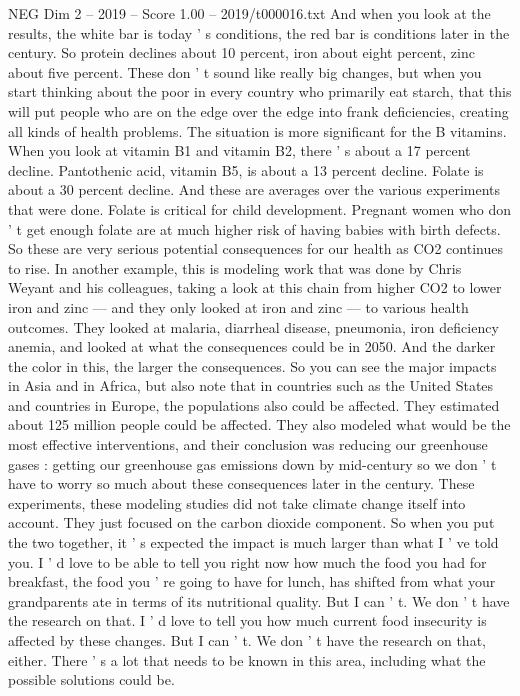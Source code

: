 \begin{textsample}{NEG Dim 2 – 2019 – Score 1.00 – 2019/t000016.txt}
And when you look at the results, the white bar is today ' s conditions, the red bar is conditions later in the century.
So protein declines about 10 percent, iron about eight percent, zinc about five percent.
These don ' t sound like really big changes, but when you start thinking about the poor in every country who primarily eat starch, that this will put people who are on the edge over the edge into frank deficiencies, creating all kinds of health problems.
The situation is more significant for the B vitamins.
When you look at vitamin B1 and vitamin B2, there ' s about a 17 percent decline.
Pantothenic acid, vitamin B5, is about a 13 percent decline.
Folate is about a 30 percent decline.
And these are averages over the various experiments that were done.
Folate is critical for child development.
Pregnant women who don ' t get enough folate are at much higher risk of having babies with birth defects.
So these are very serious potential consequences for our health as CO2 continues to rise.
In another example, this is modeling work that was done by Chris Weyant and his colleagues, taking a look at this chain from higher CO2 to lower iron and zinc — and they only looked at iron and zinc — to various health outcomes.
They looked at malaria, diarrheal disease, pneumonia, iron deficiency anemia, and looked at what the consequences could be in 2050.
And the darker the color in this, the larger the consequences.
So you can see the major impacts in Asia and in Africa, but also note that in countries such as the United States and countries in Europe, the populations also could be affected.
They estimated about 125 million people could be affected.
They also modeled what would be the most effective interventions, and their conclusion was reducing our greenhouse gases : getting our greenhouse gas emissions down by mid-century so we don ' t have to worry so much about these consequences later in the century.
These experiments, these modeling studies did not take climate change itself into account.
They just focused on the carbon dioxide component.
So when you put the two together, it ' s expected the impact is much larger than what I ' ve told you.
I ' d love to be able to tell you right now how much the food you had for breakfast, the food you ' re going to have for lunch, has shifted from what your grandparents ate in terms of its nutritional quality.
But I can ' t.
We don ' t have the research on that.
I ' d love to tell you how much current food insecurity is affected by these changes.
But I can ' t.
We don ' t have the research on that, either.
There ' s a lot that needs to be known in this area, including what the possible solutions could be.

\end{textsample}
